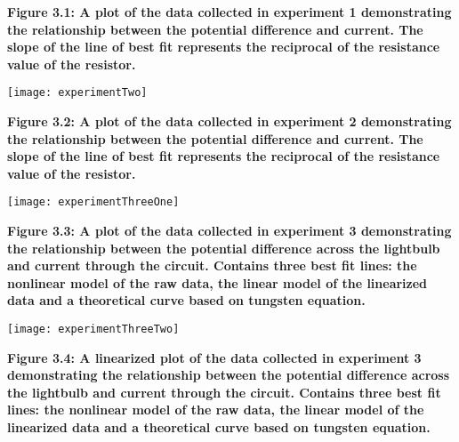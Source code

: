 \documentclass[
	letterpaper, %
	10pt, %
]{CSUniSchoolLabReport}
\begin{document}
\begin{center}
    \textbf{Figure 3.1: A plot of the data collected in experiment 1 demonstrating the relationship between the potential difference and current. The slope of the line of best fit represents the reciprocal of the resistance value of the resistor.}\\
\end{center}
\begin{center}
	\texttt{[image: experimentTwo]}
\end{center}
\begin{center}
    \textbf{Figure 3.2: A plot of the data collected in experiment 2 demonstrating the relationship between the potential difference and current. The slope of the line of best fit represents the reciprocal of the resistance value of the resistor.}\\
\end{center}
\begin{center}
	\texttt{[image: experimentThreeOne]}
\end{center}
\begin{center}
    \textbf{Figure 3.3: A plot of the data collected in experiment 3 demonstrating the relationship between the potential difference across the lightbulb and current through the circuit. Contains three best fit lines: the nonlinear model of the raw data, the linear model of the linearized data and a theoretical curve based on tungsten equation.}\\
\end{center}
\begin{center}
	\texttt{[image: experimentThreeTwo]}
\end{center}
\begin{center}
    \textbf{Figure 3.4: A linearized plot of the data collected in experiment 3 demonstrating the relationship between the potential difference across the lightbulb and current through the circuit. Contains three best fit lines: the nonlinear model of the raw data, the linear model of the linearized data and a theoretical curve based on tungsten equation.}\\
\end{center}
\newpage
\end{document}
